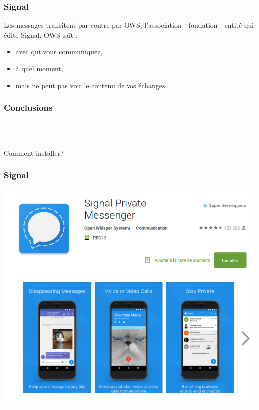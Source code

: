 \documentclass{beamer}
\begin{document}
\begin{frame}
\frametitle{Signal}
\begin{block}{Les messages transitent par contre par OWS, l’association - fondation - entité qui édite Signal. OWS sait :}
\begin{itemize}
\item avec qui vous communiquez,
\item à quel moment,
\item mais ne peut pas voir le contenu de vos échanges.
\end{itemize}
\end{block}
\end{frame}

\begin{frame}
\frametitle{Conclusions}

\\~\\
\end{frame}

\begin{frame}
\Huge{\centerline{Comment installer?}}
\end{frame}

\begin{frame}
\frametitle{Signal}
\begin{center}
\includegraphics[scale=0.3] {./images/Signal_PlayStore.png} 
\end{center}


\end{frame}
\end{document}
